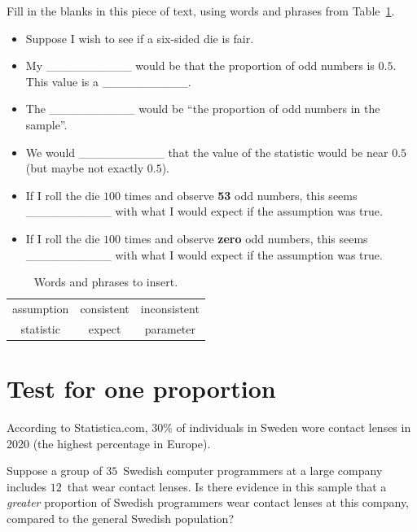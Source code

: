 \documentclass[
  11pt,
  a4paper,
  krantz2]{krantz}
\makeatletter
\providecommand{\tightlist}{%
  \setlength{\itemsep}{0pt}\setlength{\parskip}{0pt}}
\renewenvironment{quote}%
{\begin{kframe}}
{\end{kframe}}
\newenvironment{kframe}{%
\medskip{}
\setlength{\fboxsep}{.8em}
 \def\at@end@of@kframe{}%
 \ifinner\ifhmode%
  \def\at@end@of@kframe{\end{minipage}}%
  \begin{minipage}{\columnwidth}%
 \fi\fi%
 \def\FrameCommand##1{\hskip\@totalleftmargin \hskip-\fboxsep
 \colorbox{shadecolor}{##1}\hskip-\fboxsep
     \hskip-\linewidth \hskip-\@totalleftmargin \hskip\columnwidth}%
 \MakeFramed {\advance\hsize-\width
   \@totalleftmargin\z@ \linewidth\hsize
   \@setminipage}}%
 {\par\unskip\endMakeFramed%
 \at@end@of@kframe}
\renewenvironment{quote}
               {\list{}{\vspace{-0.5em}\begin{kframe}\small%
                        \rightmargin   \leftmargin
                        \parsep        \z@ \@plus\p@}%
                \item\relax}
               {\end{kframe}\endlist}
\makeatother
\begin{document}
Fill in the blanks in this piece of text,
using words and phrases from Table~\ref{tab:Words3Table}.

\begin{quote}
\begin{itemize}
\tightlist
\item
  Suppose I wish to see if a six-sided die is fair.\\
\item
  My \_\_\_\_\_\_\_\_\_\_ would be that the proportion of odd numbers is \(0.5\).
  This value is a \_\_\_\_\_\_\_\_\_\_.\\
\item
  The \_\_\_\_\_\_\_\_\_\_ would be ``the proportion of odd numbers in the sample''.\\
\item
  We would \_\_\_\_\_\_\_\_\_\_ that the value of the statistic would be near \(0.5\) (but maybe not exactly \(0.5\)).\\
\item
  If I roll the die \(100\) times and observe \textbf{53} odd numbers, this seems \_\_\_\_\_\_\_\_\_\_ with what I would expect if the assumption was true.\\
\item
  If I roll the die \(100\) times and observe \textbf{zero} odd numbers, this seems \_\_\_\_\_\_\_\_\_\_ with what I would expect if the assumption was true.
\end{itemize}
\end{quote}

\begin{table}
\centering
\caption{\label{tab:Words3Table}Words and phrases to insert.}
\centering
\fontsize{10}{12}\selectfont
\begin{tabular}[t]{ccc}
\toprule
assumption & consistent & inconsistent\\
statistic & expect & parameter\\
\bottomrule
\end{tabular}
\end{table}

\section{Test for one proportion}\label{HTOneProportionA}

According to
Statistica.com,
\(30\)\% of individuals in Sweden wore contact lenses in 2020 (the highest percentage in Europe).

Suppose a group of \(35\)~Swedish computer programmers at a large company includes \(12\)~that wear contact lenses.
Is there evidence in this sample that a \emph{greater} proportion of Swedish programmers wear contact lenses at this company, compared to the general Swedish population?
\end{document}
